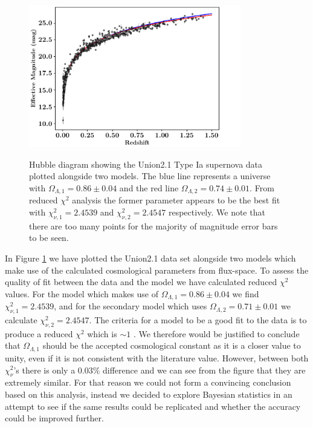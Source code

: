 \documentclass[twocolumn]{revtex4}
\begin{document}
{\begin{figure}[!h]
\begin{center}
\includegraphics[width=9.25cm]{results/hubble_diagram}
\vspace{-3ex}
\caption[]{Hubble diagram showing the Union2.1 Type Ia supernova data plotted alongside two models. The blue line represents a universe with $\Omega_{\Lambda,1}=0.86\pm0.04$ and the red line $\Omega_{\Lambda,2}=0.74\pm0.01$. From reduced $\chi^2$ analysis the former parameter appears to be the best fit with $\chi^2_{\nu,1}=2.4539$ and $\chi^2_{\nu,2}=2.4547$ respectively. We note that there are too many points for the majority of magnitude error bars to be seen.}
\vspace{-3ex}
\label{fig:hubble_diagram}
\end{center}
\end{figure}

In Figure \ref{fig:hubble_diagram} we have plotted the Union2.1 data set alongside two models which make use of the calculated cosmological parameters from flux-space. To assess the quality of fit between the data and the model we have calculated reduced $\chi^2$ values. For the model which makes use of $\Omega_{\Lambda,1}=0.86\pm0.04$ we find $\chi^2_{\nu,1}=2.4539$, and for the secondary model which uses $\Omega_{\Lambda,2}=0.71\pm0.01$ we calculate $\chi^2_{\nu,2}=2.4547$. The criteria for a model to be a good fit to the data is to produce a reduced $\chi^2$ which is $\sim1$ \cite{hugheshase}. We therefore would be justified to conclude that $\Omega_{\Lambda,1}$ should be the accepted cosmological constant as it is a closer value to unity, even if it is not consistent with the literature value.  However, between both $\chi^2_\nu$'s there is only a $0.03\%$ difference and we can see from the figure that they are extremely similar. For that reason we could not form a convincing conclusion based on this analysis, instead we decided to explore Bayesian statistics in an attempt to see if the same results could be replicated and whether the accuracy could be improved further.

}
\end{document}
